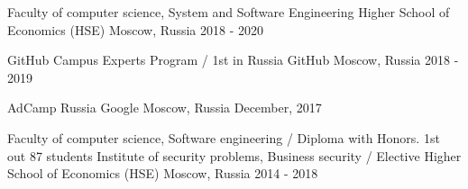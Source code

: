 

\cventryeducation
{Faculty of computer science, System and Software Engineering} %
{Higher School of Economics (HSE)} %
{Moscow, Russia} %
{2018 - 2020} %

\cventryeducation
{GitHub Campus Experts Program / 1st in Russia} %
{GitHub} %
{Moscow, Russia} %
{2018 - 2019} %

\cventryeducation
{AdCamp Russia} %
{Google} %
{Moscow, Russia} %
{December, 2017} %

\cventryeducation
{Faculty of computer science, Software engineering / Diploma with Honors. 1st out 87 students
	\newline Institute of security problems, Business security / Elective} %
{Higher School of Economics (HSE)} %
{Moscow, Russia} %
{2014 - 2018} %





